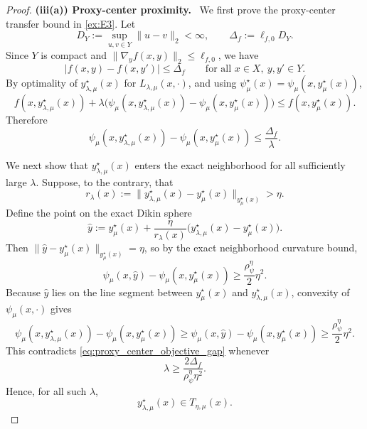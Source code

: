 \documentclass{article}
\newcommand{\proofstep}[1]{\par\smallskip\noindent\textbf{#1}\ }
\begin{document}
\begin{proof}
\proofstep{(iii(a)) Proxy-center proximity.}
We first prove the proxy-center transfer bound in \eqref{ex:E3}. Let
\[
D_Y:=\sup_{u,v\in Y}\|u-v\|_2<\infty,
\qquad
\Delta_f:=\ell_{f,0}D_Y .
\]
Since \(Y\) is compact and \(\|\nabla_y f(x,y)\|_2\le \ell_{f,0}\), we have
\[
|f(x,y)-f(x,y')|\le \Delta_f
\qquad
\text{for all }x\in X,\ y,y'\in Y.
\]
By optimality of \(y_{\lambda,\mu}^\star(x)\) for \(L_{\lambda,\mu}(x,\cdot)\), and using
\(\psi_\mu^\star(x)=\psi_\mu(x,y_\mu^\star(x))\),
\[
f(x,y_{\lambda,\mu}^\star(x))
+
\lambda\bigl(\psi_\mu(x,y_{\lambda,\mu}^\star(x))-\psi_\mu(x,y_\mu^\star(x))\bigr)
\le
f(x,y_\mu^\star(x)).
\]
Therefore
\begin{equation}
\label{eq:proxy_center_objective_gap}
\psi_\mu(x,y_{\lambda,\mu}^\star(x))-\psi_\mu(x,y_\mu^\star(x))
\le
\frac{\Delta_f}{\lambda}.
\end{equation}

We next show that \(y_{\lambda,\mu}^\star(x)\) enters the exact neighborhood for all sufficiently large
\(\lambda\). Suppose, to the contrary, that
\[
r_\lambda(x):=
\|y_{\lambda,\mu}^\star(x)-y_\mu^\star(x)\|_{y_\mu^\star(x)}
>
\eta .
\]
Define the point on the exact Dikin sphere
\[
\widehat y
:=
y_\mu^\star(x)
+
\frac{\eta}{r_\lambda(x)}
\bigl(y_{\lambda,\mu}^\star(x)-y_\mu^\star(x)\bigr).
\]
Then \(\|\widehat y-y_\mu^\star(x)\|_{y_\mu^\star(x)}=\eta\), so by the exact neighborhood curvature bound,
\[
\psi_\mu(x,\widehat y)-\psi_\mu(x,y_\mu^\star(x))
\ge
\frac{\rho_\psi^\eta}{2}\eta^2.
\]
Because \(\widehat y\) lies on the line segment between \(y_\mu^\star(x)\) and
\(y_{\lambda,\mu}^\star(x)\), convexity of \(\psi_\mu(x,\cdot)\) gives
\[
\psi_\mu(x,y_{\lambda,\mu}^\star(x))-\psi_\mu(x,y_\mu^\star(x))
\ge
\psi_\mu(x,\widehat y)-\psi_\mu(x,y_\mu^\star(x))
\ge
\frac{\rho_\psi^\eta}{2}\eta^2.
\]
This contradicts \eqref{eq:proxy_center_objective_gap} whenever
\[
\lambda\ge \frac{2\Delta_f}{\rho_\psi^\eta\eta^2}.
\]
Hence, for all such \(\lambda\),
\[
y_{\lambda,\mu}^\star(x)\in T_{\eta,\mu}(x).
\]


\end{proof}
\end{document}

